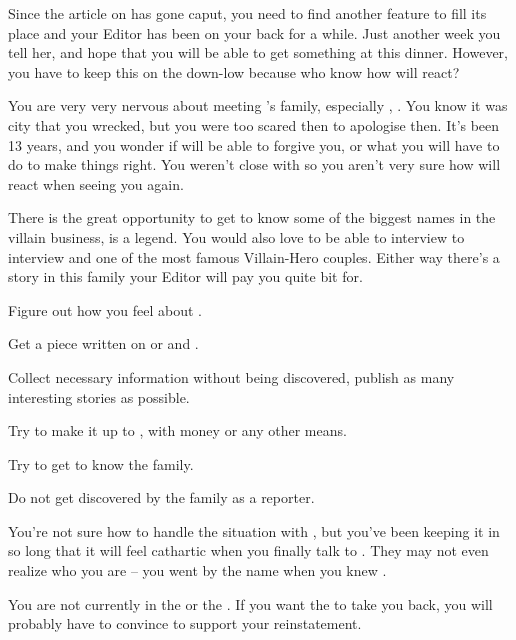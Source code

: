 \documentclass[char]{LRSguildcamp1}
\begin{document}
Since the article on \cYoungest{} has gone caput, you need to find another feature to fill its place and your Editor has been on your back for a while. Just another week you tell her, and hope that you will be able to get something at this dinner. However, you have to keep this on the down-low because who know how \cYoungest{\they} will react? 

You are very very nervous about meeting \cYoungest{}'s family, especially , \cOS{}. You know it was \cOS{\their} city that you wrecked, but you were too scared then to apologise then. It's been 13 years, and you wonder if \cOS{\they} will be able to forgive you, or what you will have to do to make things right. You weren't close with \cOS{} so you aren't very sure how \cOS{\they} will react when seeing you again. 

There is the great opportunity to get to know some of the biggest names in the villain business, \cGrandma{\MYsupername} is a legend. You would also love to be able to interview to interview \cOldest{\MYsupername} and \cOS{\MYsupername} one of the most famous Villain-Hero couples. Either way there's a story in this family your Editor will pay you quite bit for. 


\begin{itemz}[Goals]
	\item Figure out how you feel about \cYoungest{}. 
	\item Get a piece written on \cGrandma{} or \cOldest{} and \cOS{}. 
	\item Collect necessary information without being discovered, publish as many interesting stories as possible.
	\item Try to make it up to \cOS{}, with money or any other means.
	\item Try to get to know the family. 
	\item Do not get discovered by the family as a reporter. 
\end{itemz}

\begin{itemz}[Notes]
	\item You're not sure how to handle the situation with \cOS{}, but you've been keeping it in so long that it will feel cathartic when you finally talk to \cOS{\them}.  They may not even realize who you are -- you went by the name \cYSOldName{} when you knew \cOS{\them}. 
	\item You are not currently in the \cHeroLeague{\intro} or the \cVillainCompact{\intro}.  If you want the \cHeroLeague{} to take you back, you will probably have to convince \cYoungest{} to support your reinstatement. 

\end{itemz}
\end{document}
